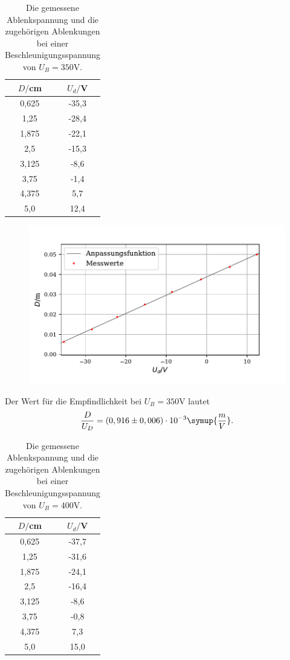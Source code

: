 \begin{table}[H]
  \centering
  \caption{Die gemessene Ablenkspannung und die zugehörigen Ablenkungen bei einer Beschleunigungsspannung von $U_B = 350 \si{\volt}$.}
  \label{tab:Parameter}
  \begin{tabular}{c c}
    \toprule
    $D/$cm& $U_d/$V \\
    \bottomrule
     0,625 & -35,3  \\
     1,25 & -28,4 \\
     1,875 & -22,1  \\
     2,5 & -15,3 \\
     3,125 & -8,6  \\
     3,75& -1,4 \\
     4,375 & 5,7  \\
     5,0 &  12,4 \\
     \bottomrule
  \end{tabular}
\end{table}

\begin{figure}[H]
  \centering
  \includegraphics{plot6.pdf}
  \caption{}
  \label{fig:plot}
\end{figure}

Der Wert für die Empfindlichkeit bei $U_B = 350 \si{\volt}$ lautet
\begin{align*}
\frac{D}{U_D} = (0,916 \pm 0,006) \cdot 10^{-3} \symup{\frac{m}{V}} .
\end{align*}

\begin{table}[H]
  \centering
  \caption{Die gemessene Ablenkspannung und die zugehörigen Ablenkungen bei einer Beschleunigungsspannung von $U_B = 400 \si{\volt}$.}
  \label{tab:Parameter}
  \begin{tabular}{c c}
    \toprule
    $D/$cm& $U_d/$V \\
    \bottomrule
     0,625 & -37,7 \\
     1,25 & -31,6 \\
     1,875 & -24,1  \\
     2,5 & -16,4 \\
     3,125 & -8,6  \\
     3,75& -0,8 \\
     4,375 & 7,3  \\
     5,0 &  15,0 \\
     \bottomrule
  \end{tabular}
\end{table}

